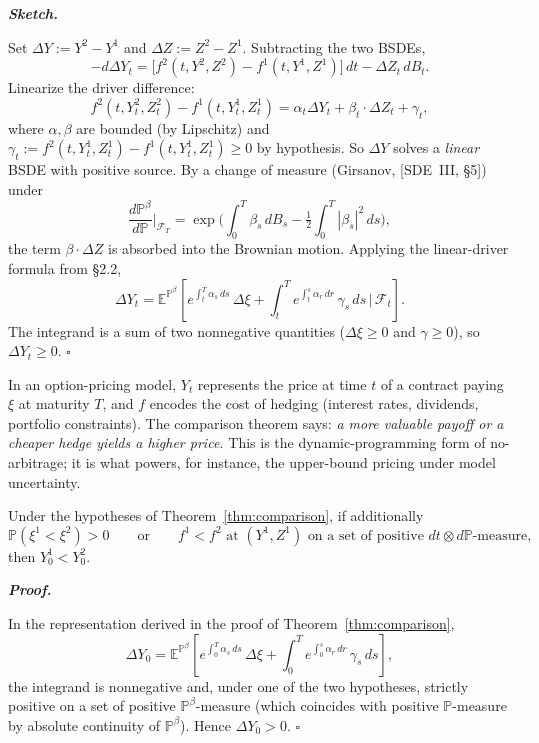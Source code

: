 \documentclass{article}
\newenvironment{proof}[1][Proof]{%
  \par\smallskip\noindent\textit{\textbf{#1.}}\quad\ignorespaces
}{%
  \hfill$\square$\par\smallskip
}
\newcommand{\E}{\mathbb{E}}
\newcommand{\Prob}{\mathbb{P}}
\newcommand{\F}{\mathcal{F}}
\begin{document}
\begin{proof}[Sketch]
Set $\Delta Y := Y^2 - Y^1$ and $\Delta Z := Z^2 - Z^1$. Subtracting the two BSDEs,
\[
  -d\Delta Y_t = \big[f^2(t, Y^2, Z^2) - f^1(t, Y^1, Z^1)\big]\,dt - \Delta Z_t\, dB_t.
\]
Linearize the driver difference:
\[
  f^2(t, Y^2_t, Z^2_t) - f^1(t, Y^1_t, Z^1_t) = \alpha_t \Delta Y_t + \beta_t \cdot \Delta Z_t + \gamma_t,
\]
where $\alpha, \beta$ are bounded (by Lipschitz) and $\gamma_t := f^2(t, Y^1_t, Z^1_t) - f^1(t, Y^1_t, Z^1_t) \ge 0$ by hypothesis. So $\Delta Y$ solves a \emph{linear} BSDE with positive source. By a change of measure (Girsanov, [SDE~III, \S5]) under
\[
  \frac{d\Prob^\beta}{d\Prob}\bigg|_{\F_T} = \exp\!\Big(\int_0^T \beta_s\, dB_s - \tfrac12\!\int_0^T |\beta_s|^2\, ds\Big),
\]
the term $\beta \cdot \Delta Z$ is absorbed into the Brownian motion. Applying the linear-driver formula from \S2.2,
\[
  \Delta Y_t = \E^{\Prob^\beta}\!\left[ e^{\int_t^T \alpha_s\, ds}\, \Delta \xi + \int_t^T e^{\int_t^s \alpha_r\, dr}\, \gamma_s\, ds \,\bigg|\, \F_t \right].
\]
The integrand is a sum of two nonnegative quantities ($\Delta \xi \ge 0$ and $\gamma \ge 0$), so $\Delta Y_t \ge 0$.
\end{proof}

\begin{remark}
In an option-pricing model, $Y_t$ represents the price at time $t$ of a contract paying $\xi$ at maturity $T$, and $f$ encodes the cost of hedging (interest rates, dividends, portfolio constraints). The comparison theorem says: \emph{a more valuable payoff or a cheaper hedge yields a higher price.} This is the dynamic-programming form of no-arbitrage; it is what powers, for instance, the upper-bound pricing under model uncertainty.
\end{remark}

\begin{corollary}\label{cor:strict-comp}
Under the hypotheses of Theorem~\ref{thm:comparison}, if additionally
\[
  \Prob(\xi^1 < \xi^2) > 0 \qquad\text{or}\qquad f^1 < f^2 \text{ at } (Y^1, Z^1)\text{ on a set of positive } dt\otimes d\Prob\text{-measure,}
\]
then $Y^1_0 < Y^2_0$.
\end{corollary}

\begin{proof}
In the representation derived in the proof of Theorem~\ref{thm:comparison},
\[
  \Delta Y_0 = \E^{\Prob^\beta}\!\left[ e^{\int_0^T \alpha_s\, ds}\, \Delta \xi + \int_0^T e^{\int_0^s \alpha_r\, dr}\, \gamma_s\, ds \right],
\]
the integrand is nonnegative and, under one of the two hypotheses, strictly positive on a set of positive $\Prob^\beta$-measure (which coincides with positive $\Prob$-measure by absolute continuity of $\Prob^\beta$). Hence $\Delta Y_0 > 0$.
\end{proof}
\end{document}
